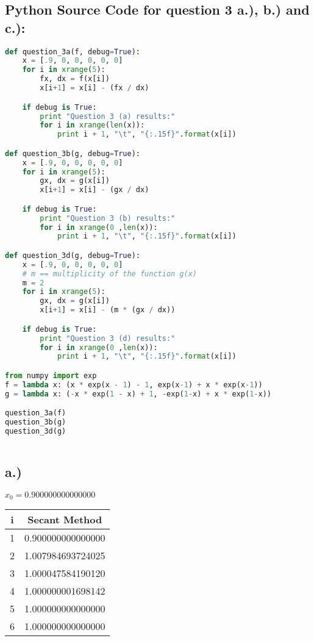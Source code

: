 \documentclass{article}
\begin{document}
\subsection*{Python Source Code for question 3 a.), b.) and c.): }
\begin{lstlisting}[language=Python]
def question_3a(f, debug=True):
    x = [.9, 0, 0, 0, 0, 0]
    for i in xrange(5):
        fx, dx = f(x[i])
        x[i+1] = x[i] - (fx / dx)

    if debug is True:
        print "Question 3 (a) results:"
        for i in xrange(len(x)):
            print i + 1, "\t", "{:.15f}".format(x[i])

def question_3b(g, debug=True):
    x = [.9, 0, 0, 0, 0, 0]
    for i in xrange(5):
        gx, dx = g(x[i])
        x[i+1] = x[i] - (gx / dx)

    if debug is True:
        print "Question 3 (b) results:"
        for i in xrange(0 ,len(x)):
            print i + 1, "\t", "{:.15f}".format(x[i])

def question_3d(g, debug=True):
    x = [.9, 0, 0, 0, 0, 0]
    # m == multiplicity of the function g(x)
    m = 2
    for i in xrange(5):
        gx, dx = g(x[i])
        x[i+1] = x[i] - (m * (gx / dx))

    if debug is True:
        print "Question 3 (d) results:"
        for i in xrange(0 ,len(x)):
            print i + 1, "\t", "{:.15f}".format(x[i])

from numpy import exp
f = lambda x: (x * exp(x - 1) - 1, exp(x-1) + x * exp(x-1))
g = lambda x: (-x * exp(1 - x) + 1, -exp(1-x) + x * exp(1-x))

question_3a(f)
question_3b(g)
question_3d(g)
    
\end{lstlisting}

\subsection*{a.)}

\textbf{$x_0 = 0.900000000000000$}
\begin{center}
    \begin{tabular}{||c c||} 
    \hline
    \textbf{i} & \textbf{Secant Method} \\ [0.5ex] 
    \hline\hline
    1 & 0.900000000000000 \\ [1ex] 
    \hline
    2 & 1.007984693724025 \\ [1ex] 
    \hline
    3 & 1.000047584190120 \\ [1ex] 
    \hline
    4 & 1.000000001698142 \\ [1ex] 
    \hline
    5 & 1.000000000000000 \\ [1ex] 
    \hline
    6 & 1.000000000000000 \\ [1ex] 
    \hline
    \end{tabular}
\end{center}
\end{document}

